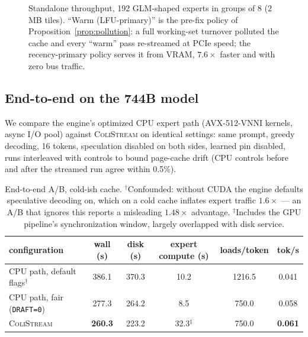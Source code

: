 \documentclass[11pt]{article}
\theoremstyle{definition}
\theoremstyle{remark}
\newcommand{\colistream}{\textsc{ColiStream}}
\begin{document}
\begin{figure}[t]
\centering
{}
\caption{Standalone throughput, 192 GLM-shaped experts in groups of 8
(2\,MB tiles). ``Warm (LFU-primary)'' is the pre-fix policy of
Proposition~\ref{prop:pollution}: a full working-set turnover polluted the
cache and every ``warm'' pass re-streamed at PCIe speed; the recency-primary
policy serves it from VRAM, $7.6\times$ faster and with zero bus traffic.}
\label{fig:warm}
\end{figure}

\subsection{End-to-end on the 744B model}
We compare the engine's optimized CPU expert path (AVX-512-VNNI kernels,
async I/O pool) against \colistream{} on identical settings: same prompt,
greedy decoding, 16 tokens, speculation disabled on both sides, learned pin
disabled, runs interleaved with controls to bound page-cache drift (CPU
controls before and after the streamed run agree within 0.5\%).

\begin{table}[h]
\centering\small
\begin{tabular}{lccccc}
\toprule
configuration & wall (s) & disk (s) & expert compute (s) & loads/token & tok/s \\
\midrule
CPU path, default flags$^\dagger$ & 386.1 & 370.3 & 10.2 & 1216.5 & 0.041 \\
CPU path, fair (\texttt{DRAFT=0}) & 277.3 & 264.2 & 8.5 & 750.0 & 0.058 \\
\colistream{} & \textbf{260.3} & 223.2 & 32.3$^\ddagger$ & 750.0 & \textbf{0.061} \\
\bottomrule
\end{tabular}
\caption{End-to-end A/B, cold-ish cache. $^\dagger$Confounded: without CUDA
the engine defaults speculative decoding on, which on a cold cache inflates
expert traffic $1.6\times$ --- an A/B that ignores this reports a misleading
$1.48\times$ advantage. $^\ddagger$Includes the GPU pipeline's synchronization
window, largely overlapped with disk service.}
\label{tab:ab}
\end{table}
\end{document}
